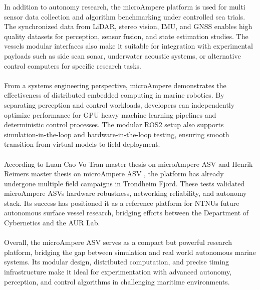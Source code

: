 In addition to autonomy research, the microAmpere platform is used for multi sensor data collection and algorithm benchmarking under controlled sea trials. The synchronized data from LiDAR, stereo vision, IMU, and GNSS enables high quality datasets for perception, sensor fusion, and state estimation studies. The vessels modular interfaces also make it suitable for integration with experimental payloads such as side scan sonar, underwater acoustic systems, or alternative control computers for specific research tasks.
\\ \\
From a systems engineering perspective, microAmpere demonstrates the effectiveness of distributed embedded computing in marine robotics. By separating perception and control workloads, developers can independently optimize performance for GPU heavy machine learning pipelines and deterministic control processes. The modular ROS2 setup also supports simulation-in-the-loop and hardware-in-the-loop testing, ensuring smooth transition from virtual models to field deployment.
\\ \\
According to Luan Cao Vo Tran master thesis on microAmpere ASV \cite{microAmpere_hardware_master_thesis1} and Henrik Reimers master thesis on microAmpere ASV \cite{microAmpere_hardware_master_thesis2}, the platform has already undergone multiple field campaigns in Trondheim Fjord. These tests validated microAmpere ASVs hardware robustness, networking reliability, and autonomy stack. Its success has positioned it as a reference platform for NTNUs future autonomous surface vessel research, bridging efforts between the Department of Cybernetics and the AUR Lab. 
\\ \\
Overall, the microAmpere ASV serves as a compact but powerful research platform, bridging the gap between simulation and real world autonomous marine systems. Its modular design, distributed computation, and precise timing infrastructure make it ideal for experimentation with advanced autonomy, perception, and control algorithms in challenging maritime environments.

